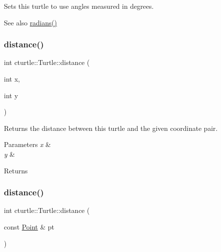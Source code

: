 Sets this turtle to use angles measured in degrees. \begin{DoxySeeAlso}{See also}
\hyperlink{classcturtle_1_1Turtle_a9c266e318f05dc5d45ddbeb830a373fa}{radians()} 
\end{DoxySeeAlso}
\mbox{\label{classcturtle_1_1Turtle_a4a6824b53f70323402d4e972f6da360c}} 
\subsubsection{\texorpdfstring{distance()}{distance()}\hspace{0.1cm}{\footnotesize\ttfamily [1/2]}}
{\footnotesize\ttfamily int cturtle\+::\+Turtle\+::distance (\begin{DoxyParamCaption}\item[{int}]{x,  }\item[{int}]{y }\end{DoxyParamCaption})\hspace{0.3cm}{\ttfamily [inline]}}

Returns the distance between this turtle and the given coordinate pair. 
\begin{DoxyParams}{Parameters}
{\em x} & \\
\hline
{\em y} & \\
\hline
\end{DoxyParams}
\begin{DoxyReturn}{Returns}

\end{DoxyReturn}
\mbox{\label{classcturtle_1_1Turtle_aa8b64c7361639dec2eafedaf640a0ebd}} 
\subsubsection{\texorpdfstring{distance()}{distance()}\hspace{0.1cm}{\footnotesize\ttfamily [2/2]}}
{\footnotesize\ttfamily int cturtle\+::\+Turtle\+::distance (\begin{DoxyParamCaption}\item[{const \hyperlink{structcturtle_1_1ivec2}{Point} \&}]{pt }\end{DoxyParamCaption})\hspace{0.3cm}{\ttfamily [inline]}}

